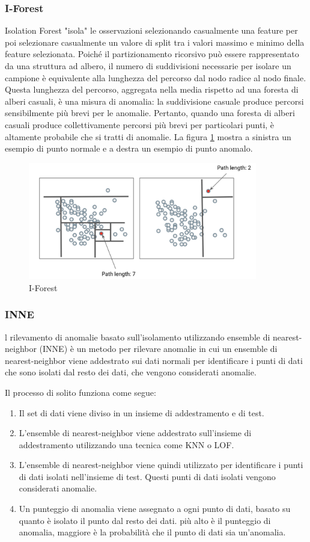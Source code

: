 \subsubsection{I-Forest}
Isolation Forest \cite{liu2008isolation, liu2012isolation} "isola" le osservazioni selezionando casualmente una feature per poi selezionare casualmente un valore di split tra i valori massimo e minimo della feature selezionata. 
Poiché il partizionamento ricorsivo può essere rappresentato da una struttura ad albero, il numero di suddivisioni necessarie per isolare un campione è equivalente alla lunghezza del percorso dal nodo radice al nodo finale.
Questa lunghezza del percorso, aggregata nella media rispetto ad una foresta di alberi casuali, è una misura di anomalia: la suddivisione casuale produce percorsi sensibilmente più brevi per le anomalie. Pertanto, quando una foresta di alberi casuali produce collettivamente percorsi più brevi per particolari punti, è altamente probabile che si tratti di anomalie.
La figura \ref{iforest} mostra a sinistra un esempio di punto normale e a destra un esempio di punto anomalo.
\begin{figure}[t]
	\centering
	\includegraphics[width=10cm, scale=1]{images/iforest}
	\caption{I-Forest}
	\label{iforest}
\end{figure}
\subsubsection{INNE}
l rilevamento di anomalie basato sull'isolamento utilizzando ensemble di nearest-neighbor (INNE) \cite{bandaragoda2018isolation} è un metodo per rilevare anomalie in cui un ensemble di nearest-neighbor viene addestrato sui dati normali per identificare i punti di dati che sono isolati dal resto dei dati, che vengono considerati anomalie.

Il processo di solito funziona come segue:
\begin{enumerate}
\item Il set di dati viene diviso in un insieme di addestramento e di test.
\item L'ensemble di nearest-neighbor viene addestrato sull'insieme di addestramento utilizzando una tecnica come KNN o LOF.
\item L'ensemble di nearest-neighbor viene quindi utilizzato per identificare i punti di dati isolati nell'insieme di test. Questi punti di dati isolati vengono considerati anomalie.
\item Un punteggio di anomalia viene assegnato a ogni punto di dati, basato su quanto è isolato il punto dal resto dei dati. più alto è il punteggio di anomalia, maggiore è la probabilità che il punto di dati sia un'anomalia.
\end{enumerate}


